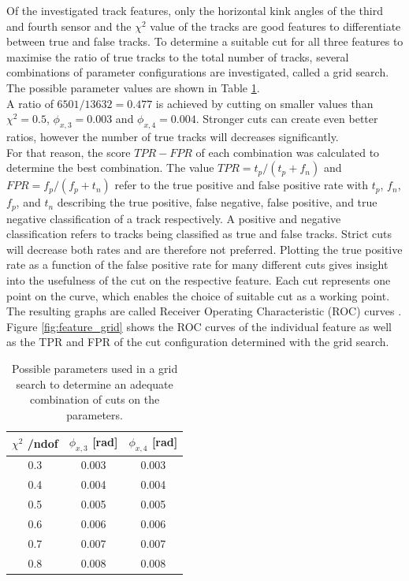 Of the investigated track features, only the horizontal kink angles of the third and fourth sensor and the $\chi^2$ value of the tracks are good
features to differentiate between true and false tracks. To determine a suitable
cut for all three features to maximise the ratio of true tracks to the total number of tracks, several combinations of parameter configurations are investigated, called a
grid search.
The possible parameter values are shown in Table \ref{tab:params}. \\
A ratio of $6501/13632 = 0.477$ is achieved by cutting on smaller values
than $\chi^2 = 0.5$, $\phi_{x,3} = 0.003$ and $\phi_{x,4}=0.004$.
Stronger cuts can create even better ratios, however the number of true tracks will decreases significantly. \\
For that reason, the score $TPR-FPR$ of each combination
was calculated to determine the best combination. The value $TPR = t_p/(t_p + f_n)$ and $FPR = f_p/(f_p + t_n)$
refer to the true positive and false positive rate with
$t_p$, $f_n$, $f_p$, and $t_n$ describing the true positive, false negative, false positive, and true negative classification of a track respectively.
A positive and negative classification refers to tracks being classified as true and false tracks.
Strict cuts will decrease both rates and are therefore not preferred. Plotting the
true positive rate as a function of the false positive rate for many different cuts gives insight into the usefulness of the cut on the respective feature. Each cut
represents one point on the curve, which enables the choice of suitable cut as a working point.
The resulting
graphs are called Receiver Operating Characteristic (ROC) curves \cite{roc}.
Figure \ref{fig:feature_grid} shows the ROC curves of the individual feature as well as the TPR and FPR of the cut configuration determined with the grid search.

\begin{table}
  \centering
  \caption{Possible parameters used in a grid search to determine an adequate combination of cuts on the parameters.}
  \begin{tabular}{c c c}
    \toprule
    $\chi^2$ /ndof & $\phi_{x,3}$ [rad] & $\phi_{x,4}$ [rad]\\
    \midrule
    0.3 & 0.003 & 0.003 \\
    0.4 & 0.004 & 0.004 \\
    0.5 & 0.005 & 0.005 \\
    0.6 & 0.006 & 0.006 \\
    0.7 & 0.007 & 0.007 \\
    0.8 & 0.008 & 0.008
  \end{tabular}
  \label{tab:params}
\end{table}



